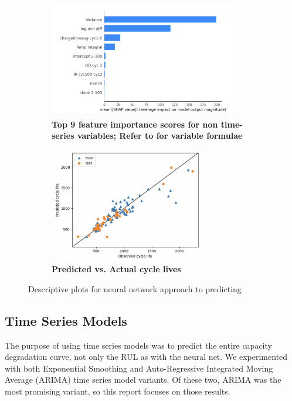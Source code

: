 \documentclass{article}
\begin{document}
\begin{figure}[H]
     \centering
     \begin{subfigure}[b]{0.5\textwidth}
         \centering
         \includegraphics[width=\textwidth,height = 5cm]{figs/shap.png}
         \caption{\textbf{Top 9 feature importance scores for non time-series variables; Refer to \cite{severson2019data} for variable formulae}}
     \end{subfigure}
     \hfill
     \begin{subfigure}[b]{0.49\textwidth}
        \centering
        \includegraphics[width=\textwidth,height = 5cm]{figs/obspred.png}
         \caption{\textbf{Predicted vs. Actual cycle lives}}
     \end{subfigure}
\caption{Descriptive plots for neural network approach to predicting} %
\label{fig:birds}
\end{figure} 

\subsection{Time Series Models}
The purpose of using time series models was to predict the entire capacity degradation curve, not only the RUL as with the neural net. We experimented with both Exponential Smoothing and Auto-Regressive Integrated Moving Average (ARIMA) time series model variants. Of these two, ARIMA was the most promising variant, so this report focuses on those results. 
\end{document}
